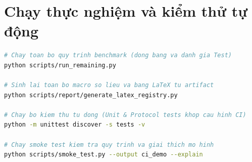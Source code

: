 \section{Chạy thực nghiệm và kiểm thử tự động}

\begin{lstlisting}[language=bash, caption={Huấn luyện, tìm kiếm siêu tham số và chạy bộ kiểm thử chuẩn CI}]
# Chay toan bo quy trinh benchmark (dong bang va danh gia Test)
python scripts/run_remaining.py

# Sinh lai toan bo macro so lieu va bang LaTeX tu artifact
python scripts/report/generate_latex_registry.py

# Chay bo kiem thu tu dong (Unit & Protocol tests khop cau hinh CI)
python -m unittest discover -s tests -v

# Chay smoke test kiem tra quy trinh va giai thich mo hinh
python scripts/smoke_test.py --output ci_demo --explain
\end{lstlisting}
